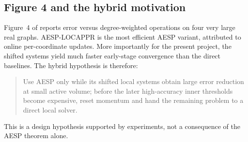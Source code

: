 \subsection{Figure 4 and the hybrid motivation}

Figure~4 of \citet{huang2025accelerated} reports error versus degree-weighted
operations on four very large real graphs.  AESP-LOCAPPR is the most efficient
AESP variant, attributed to online per-coordinate updates.  More importantly
for the present project, the shifted systems yield much faster early-stage
convergence than the direct baselines.  The hybrid hypothesis is therefore:
\begin{quote}
Use AESP only while its shifted local systems obtain large error reduction at
small active volume; before the later high-accuracy inner thresholds become
expensive, reset momentum and hand the remaining problem to a direct local
solver.
\end{quote}
This is a design hypothesis supported by experiments, not a consequence of
the AESP theorem alone.
